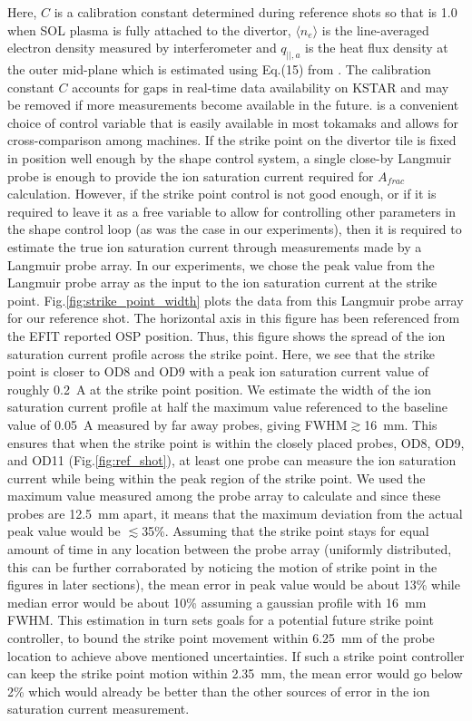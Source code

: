Here, $C$ is a calibration constant determined during reference shots so that \Afrac is 1.0 when \ac{SOL} plasma is fully attached to the divertor, $\langle n_{e} \rangle$ is the line-averaged electron density measured by interferometer and $q_{||, a}$ is the heat flux density at the outer mid-plane which is estimated using Eq.(15) from \cite{Eldon_2022_PPCF}.
The calibration constant $C$ accounts for gaps in real-time data availability on KSTAR and may be removed if more measurements become available in the future.
\Afrac is a convenient choice of control variable that is easily available in most tokamaks and allows for cross-comparison among machines.
If the strike point on the divertor tile is fixed in position well enough by the shape control system, a single close-by Langmuir probe is enough to provide the ion saturation current required for $A_{frac}$ calculation.
However, if the strike point control is not good enough, or if it is required to leave it as a free variable to allow for controlling other parameters in the shape control loop (as was the case in our experiments), then it is required to estimate the true ion saturation current through measurements made by a Langmuir probe array.
In our experiments, we chose the peak value from the Langmuir probe array as the input to the ion saturation current at the strike point.
Fig.\ref{fig:strike_point_width} plots the data from this Langmuir probe array for our reference shot.
The horizontal axis in this figure has been referenced from the EFIT reported \ac{OSP} position.
Thus, this figure shows the spread of the ion saturation current profile across the strike point.
Here, we see that the strike point is closer to OD8 and OD9 with a peak ion saturation current value of roughly 0.2~A at the strike point position.
We estimate the width of the ion saturation current profile at half the maximum value referenced to the baseline value of 0.05~A measured by far away probes, giving FWHM$\gtrsim$16~mm.
This ensures that when the strike point is within the closely placed probes, OD8, OD9, and OD11 (Fig.\ref{fig:ref_shot}), at least one probe can measure the ion saturation current while being within the peak region of the strike point.
We used the maximum value measured among the probe array to calculate \Afrac and since these probes are 12.5~mm apart, it means that the maximum deviation from the actual peak value would be $\lesssim$35\%.
Assuming that the strike point stays for equal amount of time in any location between the probe array (uniformly distributed, this can be further corraborated by noticing the motion of strike point in the figures in later sections), the mean error in peak value would be about 13\% while median error would be about 10\% assuming a gaussian profile with 16~mm FWHM.
This estimation in turn sets goals for a potential future strike point controller, to bound the strike point movement within 6.25~mm of the probe location to achieve above mentioned uncertainties.
If such a strike point controller can keep the strike point motion within 2.35~mm, the mean error would go below 2\% which would already be better than the other sources of error in the ion saturation current measurement.

